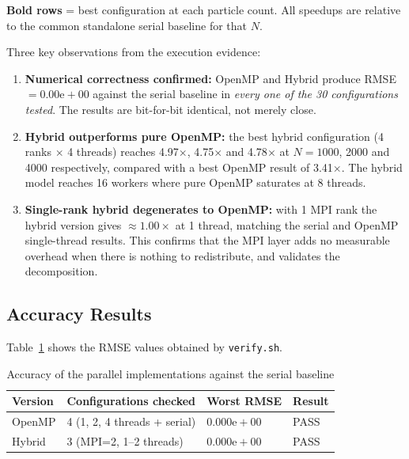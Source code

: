 \documentclass[11pt,a4paper]{article}
\begin{document}
\noindent
\textbf{Bold rows} = best configuration at each particle count.
All speedups are relative to the common standalone serial baseline for that $N$.

Three key observations from the execution evidence:

\begin{enumerate}
  \item \textbf{Numerical correctness confirmed:} OpenMP and Hybrid produce
        RMSE $=0.00\mathrm{e}{+}00$ against the serial baseline in
        \emph{every one of the 30 configurations tested}. The results are
        bit-for-bit identical, not merely close.

  \item \textbf{Hybrid outperforms pure OpenMP:} the best hybrid configuration
        (4 ranks $\times$ 4 threads) reaches 4.97$\times$, 4.75$\times$ and
        4.78$\times$ at $N=1000$, 2000 and 4000 respectively, compared with a
        best OpenMP result of 3.41$\times$. The hybrid model reaches 16 workers
        where pure OpenMP saturates at 8 threads.

  \item \textbf{Single-rank hybrid degenerates to OpenMP:} with 1 MPI rank the
        hybrid version gives $\approx 1.00\times$ at 1 thread, matching the
        serial and OpenMP single-thread results. This confirms that the MPI
        layer adds no measurable overhead when there is nothing to
        redistribute, and validates the decomposition.
\end{enumerate}

\subsection{Accuracy Results}

Table~\ref{tab:rmse} shows the RMSE values obtained by \texttt{verify.sh}.

\begin{table}[h]
\centering
\caption{Accuracy of the parallel implementations against the serial baseline}
\label{tab:rmse}
\begin{tabular}{llll}
\toprule
\textbf{Version} & \textbf{Configurations checked} & \textbf{Worst RMSE} &
\textbf{Result} \\
\midrule
OpenMP & 4 (1, 2, 4 threads + serial) & $0.000\mathrm{e}{+}00$ & PASS \\
Hybrid & 3 (MPI=2, 1--2 threads)      & $0.000\mathrm{e}{+}00$ & PASS \\
\bottomrule
\end{tabular}
\end{table}
\end{document}
